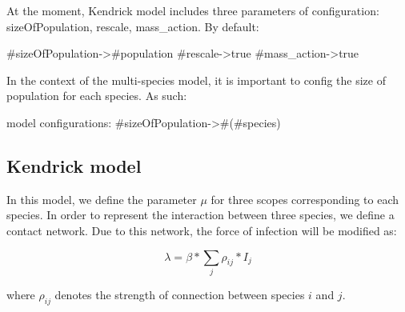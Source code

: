 \documentclass[a4paper,10pt,twoside]{book}
\begin{document}
At the moment, Kendrick model includes three parameters of configuration: sizeOfPopulation, rescale, mass\_action.
By default:


\begin{code}{}
#sizeOfPopulation->#population
#rescale->true
#mass_action->true
\end{code}


In the context of the multi-species model, it is important to config the size of population for each species.
As such:


\begin{code}{}
model configurations: {#sizeOfPopulation->#(#species)}
\end{code}

\subsection{ Kendrick model}
In this model, we define the parameter  $\mu$ for three scopes corresponding to each species.
In order to represent the interaction between three species, we define a contact network.
Due to this network, the force of infection will be modified as:

  \begin{equation}
    \lambda = \beta * \sum_j \rho_{ij} * I_j
  \end{equation}
  
where  $\rho_{ij}$ denotes the strength of connection between species  $i$ and  $j$.

\end{document}
